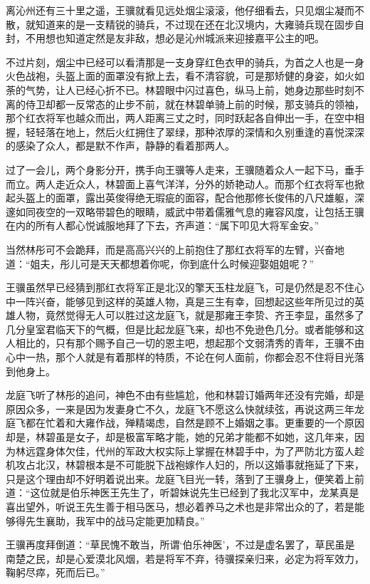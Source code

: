 离沁州还有三十里之遥，王骥就看见远处烟尘滚滚，他仔细看去，只见烟尘凝而不散，就知道来的是一支精锐的骑兵，不过现在还在北汉境内，大雍骑兵现在固步自封，不用想也知道定然是友非敌，想必是沁州城派来迎接嘉平公主的吧。

不过片刻，烟尘中已经可以看清那是一支身穿红色衣甲的骑兵，为首之人也是一身火色战袍，头盔上面的面罩没有掀上去，看不清容貌，可是那矫健的身姿，如火如荼的气势，让人已经心折不已。林碧眼中闪过喜色，纵马上前，她身边那些时刻不离的侍卫却都一反常态的止步不前，就在林碧单骑上前的时候，那支骑兵的领袖，那个红衣将军也越众而出，两人距离三丈之时，同时跃起各自伸出一手，在空中相握，轻轻落在地上，然后火红拥住了翠绿，那种浓厚的深情和久别重逢的喜悦深深的感染了众人，都是默不作声，静静的看着那两人。

过了一会儿，两个身影分开，携手向王骥等人走来，王骥随着众人一起下马，垂手而立。两人走近众人，林碧面上喜气洋洋，分外的娇艳动人。而那个红衣将军也掀起头盔上的面罩，露出英俊得绝无瑕疵的面容，配合他那修长俊伟的八尺雄躯，深邃如同夜空的一双略带碧色的眼睛，威武中带着儒雅气息的雍容风度，让包括王骥在内的所有人都心悦诚服地拜了下去，齐声道：“属下叩见大将军金安。”

当然林彤可不会跪拜，而是高高兴兴的上前抱住了那红衣将军的左臂，兴奋地道：“姐夫，彤儿可是天天都想着你呢，你到底什么时候迎娶姐姐呢？”

王骥虽然早已经猜到那红衣将军正是北汉的擎天玉柱龙庭飞，可是仍然是忍不住心中一阵兴奋，能够见到这样的英雄人物，真是三生有幸，回想起这些年所见过的英雄人物，竟然觉得无人可以胜过这龙庭飞，就是那雍王李贽、齐王李显，虽然多了几分皇室君临天下的气概，但是比起龙庭飞来，却也不免逊色几分。或者能够和这人相比的，只有那个赐予自己一切的恩主吧，想起那个文弱清秀的青年，王骥不由心中一热，那个人就是有着那样的特质，不论在何人面前，你都会忍不住将目光落到他身上。

龙庭飞听了林彤的追问，神色不由有些尴尬，他和林碧订婚两年还没有完婚，却是原因众多，一来是因为发妻身亡不久，龙庭飞不愿这么快就续弦，再说这两三年龙庭飞都在忙着和大雍作战，殚精竭虑，自然是顾不上婚姻之事。更重要的一个原因却是，林碧虽是女子，却是极富军略才能，她的兄弟才能都不如她，这几年来，因为林远霆身体欠佳，代州的军政大权实际上掌握在林碧手中，为了严防北方蛮人趁机攻占北汉，林碧根本是不可能脱下战袍嫁作人妇的，所以这婚事就拖延了下来，只是这个理由却不好明着说出来。龙庭飞目光一转，落到了王骥身上，便笑着上前道：“这位就是伯乐神医王先生了，听碧妹说先生已经到了我北汉军中，龙某真是喜出望外，听说王先生善于相马医马，想必着养马之术也是非常出众的了，若是能够得先生襄助，我军中的战马定能更加精良。”

王骥再度拜倒道：“草民愧不敢当，所谓‘伯乐神医’，不过是虚名罢了，草民虽是南楚之民，却是心爱漠北风烟，若是将军不弃，待骥探亲归来，必定为将军效力，鞠躬尽瘁，死而后已。”

